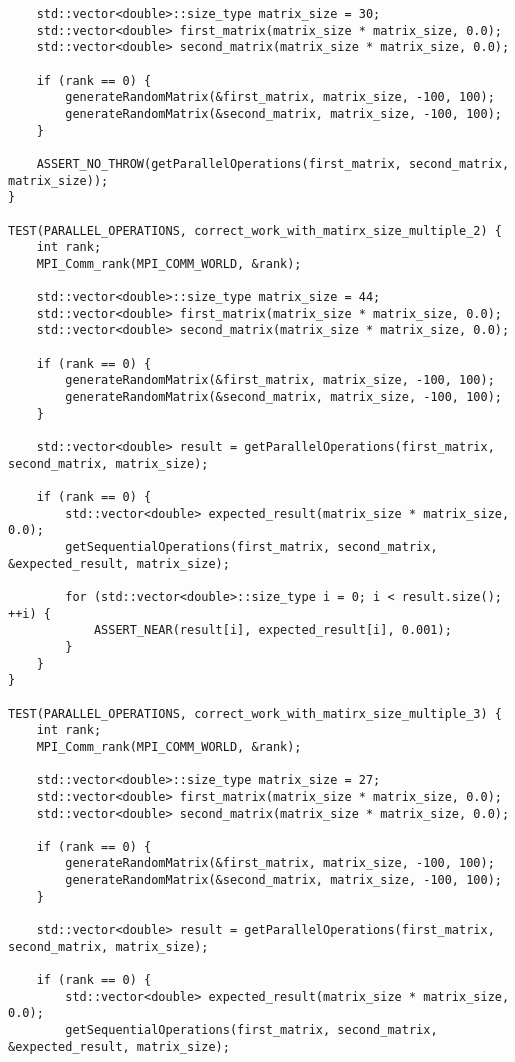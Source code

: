 \documentclass{report}
\begin{document}
\begin{lstlisting}
    std::vector<double>::size_type matrix_size = 30;
    std::vector<double> first_matrix(matrix_size * matrix_size, 0.0);
    std::vector<double> second_matrix(matrix_size * matrix_size, 0.0);

    if (rank == 0) {
        generateRandomMatrix(&first_matrix, matrix_size, -100, 100);
        generateRandomMatrix(&second_matrix, matrix_size, -100, 100);
    }

    ASSERT_NO_THROW(getParallelOperations(first_matrix, second_matrix, matrix_size));
}

TEST(PARALLEL_OPERATIONS, correct_work_with_matirx_size_multiple_2) {
    int rank;
    MPI_Comm_rank(MPI_COMM_WORLD, &rank);

    std::vector<double>::size_type matrix_size = 44;
    std::vector<double> first_matrix(matrix_size * matrix_size, 0.0);
    std::vector<double> second_matrix(matrix_size * matrix_size, 0.0);

    if (rank == 0) {
        generateRandomMatrix(&first_matrix, matrix_size, -100, 100);
        generateRandomMatrix(&second_matrix, matrix_size, -100, 100);
    }

    std::vector<double> result = getParallelOperations(first_matrix, second_matrix, matrix_size);

    if (rank == 0) {
        std::vector<double> expected_result(matrix_size * matrix_size, 0.0);
        getSequentialOperations(first_matrix, second_matrix, &expected_result, matrix_size);

        for (std::vector<double>::size_type i = 0; i < result.size(); ++i) {
            ASSERT_NEAR(result[i], expected_result[i], 0.001);
        }
    }
}

TEST(PARALLEL_OPERATIONS, correct_work_with_matirx_size_multiple_3) {
    int rank;
    MPI_Comm_rank(MPI_COMM_WORLD, &rank);

    std::vector<double>::size_type matrix_size = 27;
    std::vector<double> first_matrix(matrix_size * matrix_size, 0.0);
    std::vector<double> second_matrix(matrix_size * matrix_size, 0.0);

    if (rank == 0) {
        generateRandomMatrix(&first_matrix, matrix_size, -100, 100);
        generateRandomMatrix(&second_matrix, matrix_size, -100, 100);
    }

    std::vector<double> result = getParallelOperations(first_matrix, second_matrix, matrix_size);

    if (rank == 0) {
        std::vector<double> expected_result(matrix_size * matrix_size, 0.0);
        getSequentialOperations(first_matrix, second_matrix, &expected_result, matrix_size);


\end{lstlisting}
\end{document}
